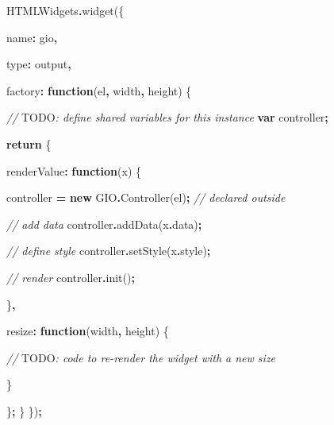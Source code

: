 \documentclass[
]{krantz}
\makeatletter
\newenvironment{Shaded}{\begin{snugshade}}{\end{snugshade}}
\newcommand{\AlertTok}[1]{\textcolor[rgb]{0.33,0.33,0.33}{#1}}
\newcommand{\AttributeTok}[1]{\textcolor[rgb]{0.61,0.61,0.61}{#1}}
\newcommand{\CommentTok}[1]{\textcolor[rgb]{0.37,0.37,0.37}{\textit{#1}}}
\newcommand{\ControlFlowTok}[1]{\textcolor[rgb]{0.27,0.27,0.27}{\textbf{#1}}}
\newcommand{\DataTypeTok}[1]{\textcolor[rgb]{0.27,0.27,0.27}{#1}}
\newcommand{\FunctionTok}[1]{\textcolor[rgb]{0,0,0}{#1}}
\newcommand{\KeywordTok}[1]{\textcolor[rgb]{0.27,0.27,0.27}{\textbf{#1}}}
\newcommand{\NormalTok}[1]{#1}
\newcommand{\OperatorTok}[1]{\textcolor[rgb]{0.43,0.43,0.43}{\textbf{#1}}}
\newcommand{\StringTok}[1]{\textcolor[rgb]{0.5,0.5,0.5}{#1}}
\newenvironment{kframe}{%
\medskip{}
\setlength{\fboxsep}{.8em}
 \def\at@end@of@kframe{}%
 \ifinner\ifhmode%
  \def\at@end@of@kframe{\end{minipage}}%
  \begin{minipage}{\columnwidth}%
 \fi\fi%
 \def\FrameCommand##1{\hskip\@totalleftmargin \hskip-\fboxsep
 \colorbox{shadecolor}{##1}\hskip-\fboxsep
     \hskip-\linewidth \hskip-\@totalleftmargin \hskip\columnwidth}%
 \MakeFramed {\advance\hsize-\width
   \@totalleftmargin\z@ \linewidth\hsize
   \@setminipage}}%
 {\par\unskip\endMakeFramed%
 \at@end@of@kframe}
\renewenvironment{Shaded}{\begin{kframe}}{\end{kframe}}
\makeatother
\begin{document}
\begin{Shaded}
\begin{Highlighting}[]
\NormalTok{HTMLWidgets}\OperatorTok{.}\FunctionTok{widget}\NormalTok{(\{}

  \DataTypeTok{name}\OperatorTok{:} \StringTok{\textquotesingle{}gio\textquotesingle{}}\OperatorTok{,}

  \DataTypeTok{type}\OperatorTok{:} \StringTok{\textquotesingle{}output\textquotesingle{}}\OperatorTok{,}

  \DataTypeTok{factory}\OperatorTok{:} \KeywordTok{function}\NormalTok{(el}\OperatorTok{,}\NormalTok{ width}\OperatorTok{,}\NormalTok{ height) \{}

    \CommentTok{// }\AlertTok{TODO}\CommentTok{: define shared variables for this instance}
    \KeywordTok{var}\NormalTok{ controller}\OperatorTok{;}

    \ControlFlowTok{return}\NormalTok{ \{}

      \DataTypeTok{renderValue}\OperatorTok{:} \KeywordTok{function}\NormalTok{(x) \{}

\NormalTok{        controller }\OperatorTok{=} \KeywordTok{new}\NormalTok{ GIO}\OperatorTok{.}\FunctionTok{Controller}\NormalTok{(el)}\OperatorTok{;} \CommentTok{// declared outside}
        
        \CommentTok{// add data}
\NormalTok{        controller}\OperatorTok{.}\FunctionTok{addData}\NormalTok{(x}\OperatorTok{.}\AttributeTok{data}\NormalTok{)}\OperatorTok{;}

        \CommentTok{// define style}
\NormalTok{        controller}\OperatorTok{.}\FunctionTok{setStyle}\NormalTok{(x}\OperatorTok{.}\AttributeTok{style}\NormalTok{)}\OperatorTok{;}

        \CommentTok{// render}
\NormalTok{        controller}\OperatorTok{.}\FunctionTok{init}\NormalTok{()}\OperatorTok{;}

\NormalTok{      \}}\OperatorTok{,}

      \DataTypeTok{resize}\OperatorTok{:} \KeywordTok{function}\NormalTok{(width}\OperatorTok{,}\NormalTok{ height) \{}

        \CommentTok{// }\AlertTok{TODO}\CommentTok{: code to re{-}render the widget with a new size}

\NormalTok{      \}}

\NormalTok{    \}}\OperatorTok{;}
\NormalTok{  \}}
\NormalTok{\})}\OperatorTok{;}
\end{Highlighting}
\end{Shaded}
\end{document}
